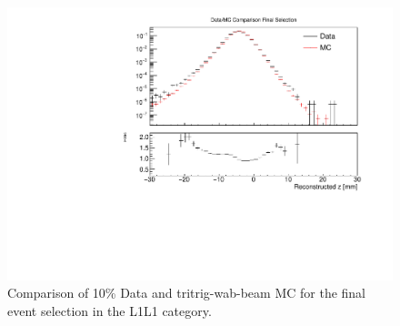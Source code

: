 \begin{figure}[!ht] 
    \centering
    \includegraphics[width=.85\textwidth]{figs/selection/final_compare.pdf}
    \caption{
    	Comparison of 10\% Data and tritrig-wab-beam MC for the final event selection in the L1L1 category.
    }
    \label{fig:singleV0_L1L1}
\end{figure}  

